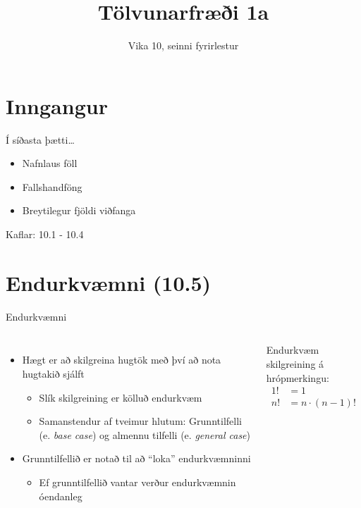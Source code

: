 \documentclass[handout]{beamer}
\title{Tölvunarfræði 1a}
\subtitle{Vika 10, seinni fyrirlestur}
\begin{document}
\begin{frame}
\titlepage
\end{frame}

\section{Inngangur}

\begin{frame}{Í síðasta þætti\ldots}
\begin{itemize}
 \item Nafnlaus föll
 \item Fallshandföng
 \item Breytilegur fjöldi viðfanga
\end{itemize}
Kaflar: 10.1 - 10.4 
\end{frame}

\section{Endurkvæmni (10.5)}

\begin{frame}[fragile]{Endurkvæmni}
\begin{columns}
\begin{itemize}
 \item Hægt er að skilgreina hugtök með því að nota hugtakið sjálft
 \begin{itemize}
  \item Slík skilgreining er kölluð endurkvæm
  \item Samanstendur af tveimur hlutum: Grunntilfelli (e. \emph{base case}) og almennu tilfelli (e. \emph{general case})
 \end{itemize}
 \item Grunntilfellið er notað til að ``loka'' endurkvæmninni
 \begin{itemize}
  \item Ef grunntilfellið vantar verður endurkvæmnin óendanleg
 \end{itemize}
\end{itemize}

\vspace{0.1cm}
Endurkvæm skilgreining á hrópmerkingu:
\begin{align*}
1! &= 1\\
n! &= n\cdot(n-1)!\\
\end{align*}

\end{columns}
\end{frame}
\end{document}
